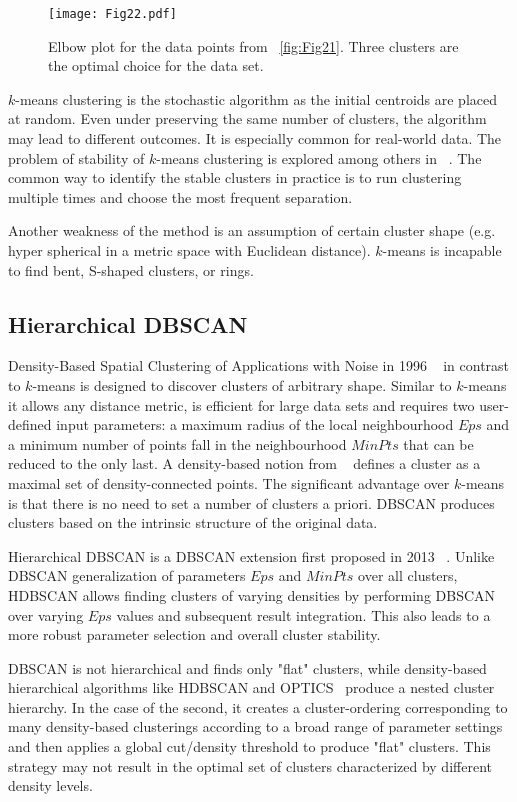\begin{figure}[H]
    \centering
    \texttt{[image: Fig22.pdf]}
    \caption{Elbow plot for the data points from ~\autoref{fig:Fig21}. Three clusters are the optimal choice for the data set.}
    \label{fig:Fig22}
\end{figure}

$k$-means clustering is the stochastic algorithm as the initial centroids are placed at random. Even under preserving the same number of clusters, the algorithm may lead to different outcomes. It is especially common for real-world data. The problem of stability of $k$-means clustering is explored among others in ~\cite{ClusterStability2007}. The common way to identify the stable clusters in practice is to run clustering multiple times and choose the most frequent separation.

Another weakness of the method is an assumption of certain cluster shape (e.g. hyper spherical in a metric space with Euclidean distance). $k$-means is incapable to find bent, S-shaped clusters, or rings.

\subsection{Hierarchical DBSCAN}
Density-Based Spatial Clustering of Applications with Noise in 1996 ~\cite{DBSCAN} in contrast to $k$-means is designed to discover clusters of arbitrary shape. Similar to $k$-means it allows any distance metric, is efficient for large data sets and requires two user-defined input parameters: a maximum radius of the local neighbourhood $Eps$ and a minimum number of points fall in the neighbourhood $MinPts$ that can be reduced to the only last. A density-based notion from ~\cite{DBSCAN} defines a cluster as a maximal set of density-connected points. The significant advantage over $k$-means is that there is no need to set a number of clusters a priori. DBSCAN produces clusters based on the intrinsic structure of the original data.

Hierarchical DBSCAN is a DBSCAN extension first proposed in 2013 ~\cite{HDBSCAN}. Unlike DBSCAN generalization of parameters $Eps$ and $MinPts$ over all clusters, HDBSCAN allows finding clusters of varying densities by performing DBSCAN over varying $Eps$ values and subsequent result integration. This also leads to a more robust parameter selection and overall cluster stability. 

DBSCAN is not hierarchical and finds only "flat" clusters, while density-based hierarchical algorithms like HDBSCAN and OPTICS~\cite{OPTICS1999Ankerst} produce a nested cluster hierarchy. In the case of the second, it creates a cluster-ordering corresponding to many density-based clusterings according to a broad range of parameter settings and then applies a global cut/density threshold to produce "flat" clusters. This strategy may not result in the optimal set of clusters characterized by different density levels.

